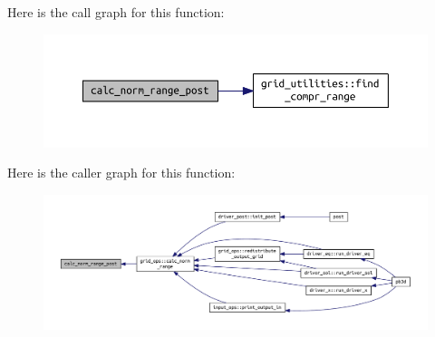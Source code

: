 Here is the call graph for this function\+:\nopagebreak
\begin{figure}[H]
\begin{center}
\leavevmode
\includegraphics[width=350pt]{grid__ops_8f90_aa3b47be0188da6dd19a745f796c1500f_cgraph}
\end{center}
\end{figure}
Here is the caller graph for this function\+:\nopagebreak
\begin{figure}[H]
\begin{center}
\leavevmode
\includegraphics[width=350pt]{grid__ops_8f90_aa3b47be0188da6dd19a745f796c1500f_icgraph}
\end{center}
\end{figure}
